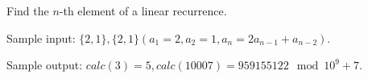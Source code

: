 Find the $n$-th element of a linear recurrence.

Sample input: $\{2,1\},\{2,1\}(a_1=2,a_2=1,a_n=2a_{n-1}+a_{n-2})$.

Sample output: $calc(3)=5,calc(10007)=959155122\mod 10^9+7$.


